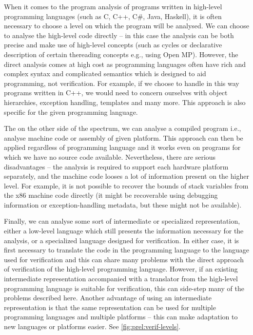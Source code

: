 When it comes to the program analysis of programs written in high-level programming languages (such as C, C++, C\#, Java, Haskell),\footnotemark{} it is often necessary to choose a level on which the program will be analysed.
We can choose to analyse the high-level code directly -- in this case the analysis can be both precise and make use of high-level concepts (such as cycles or declarative description of certain thereading concepts e.g., using Open MP\footnotemark{}).
However, the direct analysis comes at high cost as programming languages often have rich and complex syntax and complicated semantics which is designed to aid programming, not verification.
For example, if we choose to handle in this way programs written in C++, we would need to concern ourselves with object hierarchies, exception handling, templates and many more.
This approach is also specific for the given programming language.


The on the other side of the spectrum, we can analyse a compiled program i.e., analyse machine code or assembly of given platform.
This approach can then be applied regardless of programming language and it works even on programs for which we have no source code available.
Nevertheless, there are serious disadvantages -- the analysis is required to support each hardware platform separately, and the machine code looses a lot of information present on the higher level.
For example, it is not possible to recover the bounds of stack variables from the x86 machine code directly (it might be recoverable using debugging information or exception-handling metadata, but these might not be available).

Finally, we can analyse some sort of intermediate or specialized representation, either a low-level language which still presents the information necessary for the analysis, or a specialized language designed for verification.
In either case, it is first necessary to translate the code in the programming language to the language used for verification and this can share many problems with the direct approach of verification of the high-level programming language.
However, if an existing intermediate representation accompanied with a translator from the high-level programming language is suitable for verification, this can side-step many of the problems described here.
Another advantage of using an intermediate representation is that the same representation can be used for multiple programming languages and multiple platforms -- this can make adaptation to new languages or platforms easier.
See \autoref{fig:prel:verif-levels}.

